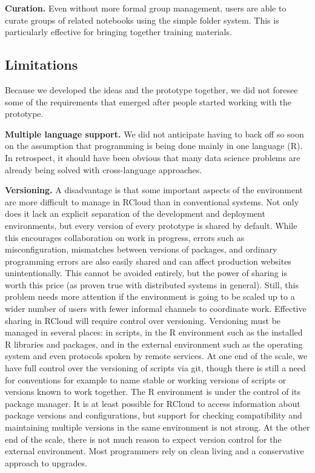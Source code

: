 {\bf Curation.} Even without more formal group management, users are
able to curate groups of related notebooks using the simple folder
system.  This is particularly effective for bringing together
training materials.

\subsection{Limitations}

Because we developed the ideas and the prototype together,
we did not foresee some of the requirements that emerged
after people started working with the prototype.

{\bf Multiple language support.}
We did not anticipate having to back off so soon on the
assumption that programming is being done mainly in one
language (R). In retrospect, it should have been obvious
that many data science problems are already being solved
with cross-language approaches.

{\bf Versioning.}
A disadvantage is that some important aspects of the environment
are more difficult to manage in RCloud than in conventional systems.
Not only does it lack an explicit separation of the development and
deployment environments, but every version of every prototype is
shared by default. While this encourages collaboration on work
in progress, errors such as misconfiguration, mismatches between
versions of packages, and ordinary programming errors are also
easily shared and can affect production websites unintentionally.
This cannot be avoided entirely, but the power of sharing is worth
this price (as proven true with distributed systems in general).
Still, this problem needs more attention if the environment is
going to be scaled up to a wider number of users with fewer
informal channels to coordinate work. Effective sharing in RCloud
will require control over versioning.
Versioning must be managed in several places: in scripts, in the R environment
such as the installed R libraries and packages, and in the external
environment such as the operating system and even protocols spoken by
remote services. At one end of the scale, we have full control over the
versioning of scripts via git, though there is still a need for conventions
for example to name stable or working versions of scripts or versions known
to work together. The R environment is under the control of its package
manager. It is at least possible for RCloud to access information about
package versions and configurations, but support for checking compatibility
and maintaining multiple versions in the same environment is not strong.
At the other end of the scale, there is not much reason to expect version
control for the external environment. Most programmers rely on clean living
and a conservative approach to upgrades.


